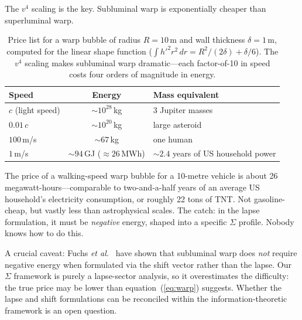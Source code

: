 \documentclass[12pt]{article}
\renewcommand{\baselinestretch}{2.0}
\begin{document}
The $v^4$ scaling is the key. Subluminal warp is exponentially cheaper
than superluminal warp.

\begin{table}[h]
\renewcommand{\baselinestretch}{1.2}\selectfont
\centering
\begin{tabular}{@{}l c l@{}}
\toprule
Speed & Energy & Mass equivalent \\
\midrule
$c$ (light speed)  & $\sim 10^{28}$\,kg  & 3 Jupiter masses \\
$0.01\,c$          & $\sim 10^{20}$\,kg  & large asteroid \\
$100$\,m/s         & $\sim 67$\,kg        & one human \\
$1$\,m/s           & ${\sim}94$\,GJ ($\approx 26$\,MWh) & ${\sim}2.4$ years of US household power\footnotemark[1] \\
\bottomrule
\end{tabular}
\caption{Price list for a warp bubble of radius $R = 10$\,m and wall
thickness $\delta = 1$\,m, computed for the linear shape function
($\int h'^2 r^2\,dr = R^2/(2\delta) + \delta/6$). The $v^4$ scaling makes
subluminal warp dramatic---each factor-of-10 in speed costs four orders
of magnitude in energy.}
\label{tab:warp}
\end{table}


The price of a walking-speed warp bubble for a 10-metre vehicle is
about 26 megawatt-hours---comparable to two-and-a-half years of an
average US household's electricity consumption, or roughly 22 tons of
TNT. Not gasoline-cheap, but vastly less than astrophysical scales.
The catch: in the lapse formulation, it must be \emph{negative}
energy, shaped into a specific $\Sigma$ profile. Nobody knows how
to do this.

A crucial caveat: Fuchs \emph{et al.}\ \cite{Fuchs2024} have shown
that subluminal warp does \emph{not} require negative energy when
formulated via the shift vector rather than the lapse. Our $\Sigma$
framework is purely a lapse-sector analysis, so it overestimates the
difficulty: the true price may be lower than
equation~(\ref{eq:warp}) suggests. Whether the lapse and shift
formulations can be reconciled within the information-theoretic
framework is an open question.
\end{document}
